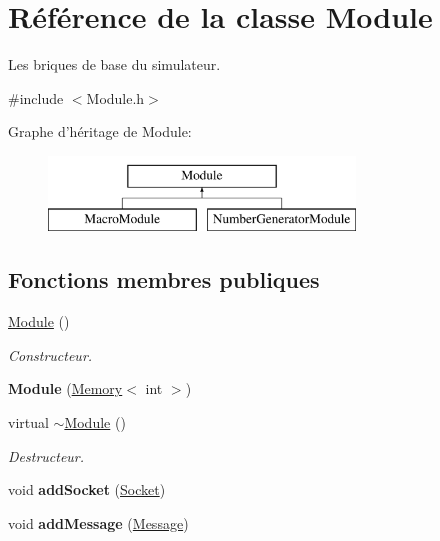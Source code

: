 \hypertarget{classModule}{\section{Référence de la classe Module}
\label{classModule}
}


Les briques de base du simulateur.  




{\ttfamily \#include $<$Module.\-h$>$}

Graphe d'héritage de Module\-:\begin{figure}[H]
\begin{center}
\leavevmode
\includegraphics[height=2.000000cm]{classModule}
\end{center}
\end{figure}
\subsection*{Fonctions membres publiques}
\begin{DoxyCompactItemize}
\item 
\hypertarget{classModule_a5a240a8a9ab1813b17bcb810b24ceaea}{\hyperlink{classModule_a5a240a8a9ab1813b17bcb810b24ceaea}{Module} ()}\label{classModule_a5a240a8a9ab1813b17bcb810b24ceaea}

\begin{DoxyCompactList}\small\item\em Constructeur. \end{DoxyCompactList}\item 
\hypertarget{classModule_a891a2c8076ed8003609a62b02577d77f}{{\bfseries Module} (\hyperlink{classMemory}{Memory}$<$ int $>$)}\label{classModule_a891a2c8076ed8003609a62b02577d77f}

\item 
\hypertarget{classModule_a7c9d9c096786d127590fdd8aa2b7d681}{virtual \hyperlink{classModule_a7c9d9c096786d127590fdd8aa2b7d681}{$\sim$\-Module} ()}\label{classModule_a7c9d9c096786d127590fdd8aa2b7d681}

\begin{DoxyCompactList}\small\item\em Destructeur. \end{DoxyCompactList}\item 
\hypertarget{classModule_aeb7302c667eb923a4dc25ae235c744dc}{void {\bfseries add\-Socket} (\hyperlink{classSocket}{Socket})}\label{classModule_aeb7302c667eb923a4dc25ae235c744dc}

\item 
\hypertarget{classModule_ae8010c1b16b5342bd13955e15961853a}{void {\bfseries add\-Message} (\hyperlink{classMessage}{Message})}\label{classModule_ae8010c1b16b5342bd13955e15961853a}

\end{DoxyCompactItemize}


